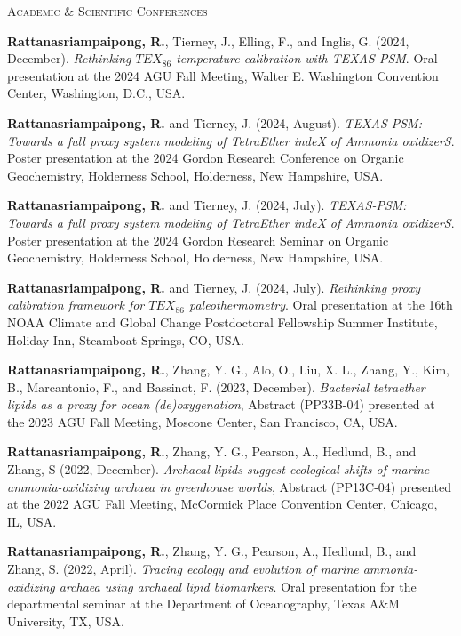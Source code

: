 \documentclass[10pt]{article}
\newcommand{\myname}[1]{\textbf{Rattanasriampaipong, R.}}
\newcommand{\margintext}[1]{\marginnote{\normalsize\textbf #1 |}}
\begin{document}
\bigskip
\margintext{Presentations} 
\textsc{Academic \& Scientific Conferences}
\begin{etaremune}
\item {\myname{rattanasriampaipong}}, Tierney, J., Elling, F., and Inglis, G. (2024, December). \textit{Rethinking $TEX_{86}$ temperature calibration with TEXAS-PSM}. Oral presentation at the 2024 AGU Fall Meeting, Walter E. Washington Convention Center, Washington, D.C., USA.

\item {\myname{rattanasriampaipong}} and Tierney, J. (2024, August). \textit{TEXAS-PSM: Towards a full proxy system modeling of TetraEther indeX of Ammonia oxidizerS}. Poster presentation at the 2024 Gordon Research Conference on Organic Geochemistry, Holderness School, Holderness, New Hampshire, USA.

\item {\myname{rattanasriampaipong}} and Tierney, J. (2024, July). \textit{TEXAS-PSM: Towards a full proxy system modeling of TetraEther indeX of Ammonia oxidizerS}. Poster presentation at the 2024 Gordon Research Seminar on Organic Geochemistry, Holderness School, Holderness, New Hampshire, USA.

\item {\myname{rattanasriampaipong}} and Tierney, J. (2024, July). \textit{Rethinking proxy calibration framework for $TEX_{86}$ paleothermometry}. Oral presentation at the 16th NOAA Climate and Global Change Postdoctoral Fellowship Summer Institute, Holiday Inn, Steamboat Springs, CO, USA.

\item {\myname{rattanasriampaipong}}, Zhang, Y. G., Alo, O., Liu, X. L., Zhang, Y., Kim, B., Marcantonio, F., and Bassinot, F. (2023, December). \textit{Bacterial tetraether lipids as a proxy for ocean (de)oxygenation}, Abstract (PP33B-04) presented at the 2023 AGU Fall Meeting, Moscone Center, San Francisco, CA, USA.

\item {\myname{rattanasriampaipong}}, Zhang, Y. G., Pearson, A., Hedlund, B., and Zhang, S (2022, December). \textit{Archaeal lipids suggest ecological shifts of marine ammonia-oxidizing archaea in greenhouse worlds}, Abstract (PP13C-04) presented at the 2022 AGU Fall Meeting, McCormick Place Convention Center, Chicago, IL, USA.

\item {\myname{rattanasriampaipong}}, Zhang, Y. G., Pearson, A., Hedlund, B., and Zhang, S. (2022, April). \textit{Tracing ecology and evolution of marine ammonia-oxidizing archaea using archaeal lipid biomarkers}. Oral presentation for the departmental seminar at the Department of Oceanography, Texas A\&M University, TX, USA.


\end{etaremune}
\end{document}
